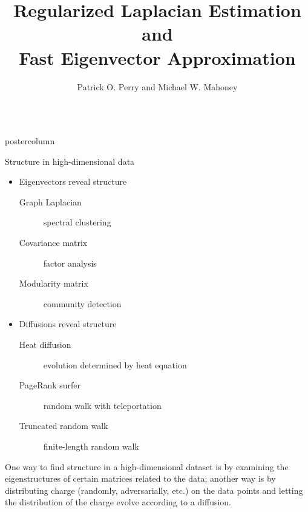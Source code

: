 \documentclass[final,hyperref={pdfpagelabels=false}]{beamer}
\title{\huge Regularized Laplacian Estimation and \\ Fast Eigenvector
Approximation}
\author{Patrick O. Perry and Michael W. Mahoney}
\institute{NYU Stern and Stanford University}
\newlength{\columnheight}
\begin{document}
\begin{frame}
  \begin{columns}
    \begin{column}{.49\textwidth}
      \begin{beamercolorbox}[center,wd=\textwidth]{postercolumn}
        \begin{minipage}[T]{.95\textwidth}  %
          \parbox[t][\columnheight]{\textwidth}{ %
            \begin{block}{Structure in high-dimensional data}
              \begin{itemize}

              \item Eigenvectors reveal structure
	        \begin{description}
	      	\item[Graph Laplacian] spectral clustering
		\item[Covariance matrix] factor analysis
		\item[Modularity matrix] community detection
		\end{description}

		\vspace{1em}
              \item Diffusions reveal structure
	        \begin{description}
		\item[Heat diffusion] evolution determined by heat equation
		\item[PageRank surfer] random walk with teleportation
		\item[Truncated random walk] finite-length random walk
		\end{description}

              \end{itemize}              

		\vspace{1em}
	      One way to find structure in a high-dimensional dataset is by
	      examining the eigenstructures of certain matrices related to the
	      data; another way is by distributing charge (randomly,
	      adversarially, etc.) on the data points and letting the
	      distribution of the charge evolve according to a diffusion.


\end{block}}
\end{minipage}
\end{beamercolorbox}
\end{column}
\end{columns}
\end{frame}
\end{document}
